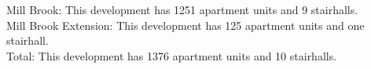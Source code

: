 {Mill Brook}: This development has 1251 apartment units and 9 stairhalls.\\{Mill Brook Extension}: This development has 125 apartment units and one stairhall.\\{Total}: This development has 1376 apartment units and 10 stairhalls.\\